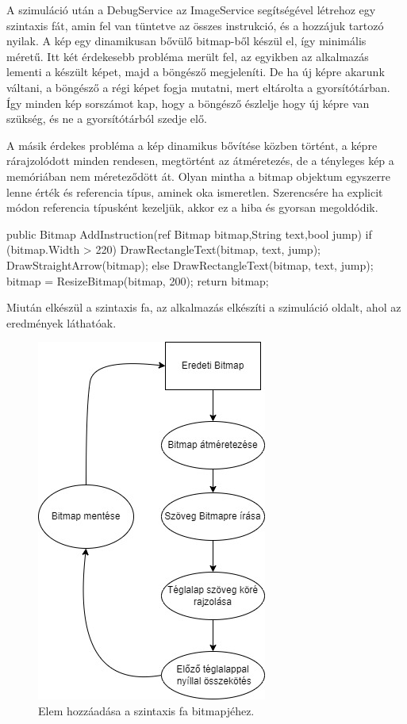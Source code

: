 A szimuláció után a DebugService az ImageService segítségével létrehoz egy szintaxis fát, amin fel van tüntetve az összes instrukció, és a hozzájuk tartozó nyilak. A kép egy dinamikusan bővülő bitmap-ből készül el, így minimális méretű. Itt két érdekesebb probléma merült fel, az egyikben az alkalmazás lementi a készült képet, majd a böngésző megjeleníti. De ha új képre akarunk váltani, a böngésző a régi képet fogja mutatni, mert eltárolta a gyorsítótárban. Így minden kép sorszámot kap, hogy a böngésző észlelje hogy új képre van szükség, és ne a gyorsítótárból szedje elő. 

A másik érdekes probléma a kép dinamikus bővítése közben történt, a képre rárajzolódott minden rendesen, megtörtént az átméretezés, de a tényleges kép a memóriában nem méreteződött át. Olyan mintha a bitmap objektum egyszerre lenne érték és referencia típus, aminek oka ismeretlen. Szerencsére ha explicit módon referencia típusként kezeljük, akkor ez a hiba és gyorsan megoldódik.

\begin{cpp}
public Bitmap AddInstruction(ref Bitmap bitmap,String text,bool jump)
{
      if (bitmap.Width > 220)
      {
           DrawRectangleText(bitmap, text, jump);
           DrawStraightArrow(bitmap);
       }
       else
       {
           DrawRectangleText(bitmap, text, jump);
       }
       bitmap = ResizeBitmap(bitmap, 200);
       return bitmap;
}
\end{cpp}

Miután elkészül a szintaxis fa, az alkalmazás elkészíti a szimuláció oldalt, ahol az eredmények láthatóak.

\begin{figure}[h]
\centering
\includegraphics[scale=0.7]{images/ST.jpg}
\caption{Elem hozzáadása a szintaxis fa bitmapjéhez.}
\label{fig:st}
\end{figure}

